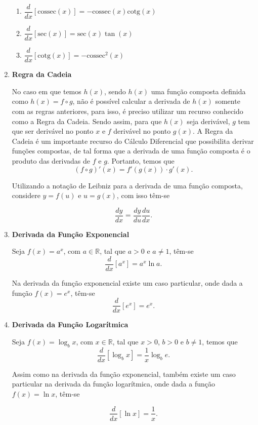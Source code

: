 \documentclass[
	12pt,				%
	openright,			%
    twoside,			%
	a4paper,			%
	chapter=TITLE,		%
	english,			%
	french,				%
	spanish,			%
	brazil				%
	]{abntex2}
\numberwithin{lema}{chapter}
\numberwithin{teorema}{chapter}
\numberwithin{definicao}{chapter}
\numberwithin{exemplo}{chapter}
\numberwithin{figure}{chapter}
\begin{document}
\begin{enumerate}
\begin{enumerate}
		\item $\dfrac{d}{dx}[\text{cossec}(x)] = -\text{cossec}(x)\text{cotg}(x)$
		\label{derivada_cossec}
		
		\item $\dfrac{d}{dx}[\text{sec}(x)] = \text{sec}(x)\tan(x)$
		\label{derivada_sec}
		
		\item $\dfrac{d}{dx}[\text{cotg}(x)] = -\text{cossec}^{2}(x)$
		\label{derivada_cotg}
	\end{enumerate}	
	
	\item \textbf{Regra da Cadeia}
	\label{derivada_cadeia}
	
	No caso em que temos $h(x)$, sendo $h(x)$ uma função composta definida como $h(x) = f \circ g$, não é possível calcular a derivada de $h(x)$ somente com as regras anteriores, para isso, é preciso utilizar um recurso conhecido como a Regra da Cadeia. Sendo assim, para que $h(x)$ seja derivável, $g$ tem que ser derivável no ponto $x$ e $f$ derivável no ponto $g(x)$. A Regra da Cadeia é um importante recurso do Cálculo Diferencial que possibilita derivar funções compostas, de tal forma que a derivada de uma função composta é o produto das derivadas de $f$ e $g$. Portanto, temos que
	$$ (f \circ g)'(x) = f'(g(x)) \cdot g'(x).$$	 
	
	Utilizando a notação de Leibniz para a derivada de uma função composta, considere $y = f(u)$ e $u = g(x)$, com isso têm-se
	
	$$ \dfrac{dy}{dx} = \dfrac{dy}{du}\dfrac{du}{dx}. $$
	
	\item \textbf{Derivada da Função Exponencial}
	\label{derivada_exponecial}
	
	Seja $f(x) = a^{x}$, com $a\in \mathbb{R}$, tal que $a > 0$ e $a \neq 1$, têm-se
	$$  \dfrac{d}{dx}[a^{x}] = a^{x}\ln a. $$
	
	Na  derivada da função exponencial existe um caso particular, onde dada a função $f(x) = e^{x}$, têm-se
	$$  \dfrac{d}{dx}[e^{x}] = e^{x}. $$
	
	\item \textbf{Derivada da Função Logarítmica}
	\label{derivada_logaritmica}
	
	Seja $f(x) = \log_b x$, com $x\in \mathbb{R}$, tal que $x > 0$, $b > 0$ e $b \neq 1$, temos que
	$$ \dfrac{d}{dx}[\log_b x] = \dfrac{1}{x}\log_b e.  $$
	
	Assim como na derivada da função exponencial, também existe um caso particular na derivada da função logarítmica, onde dada a função $f(x) = \ln x$, têm-se
	
	$$ \dfrac{d}{dx}[\ln x] = \dfrac{1}{x}.$$
	
\end{enumerate}
\end{document}
